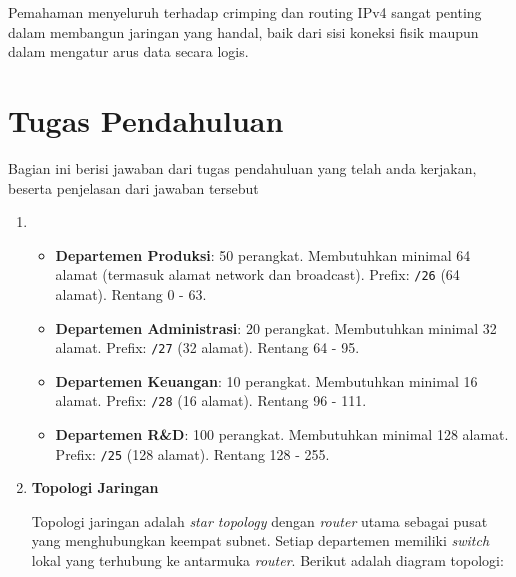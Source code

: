 Pemahaman menyeluruh terhadap crimping dan routing IPv4 sangat penting dalam membangun jaringan yang handal, baik dari sisi koneksi fisik maupun dalam mengatur arus data secara logis.

\section{Tugas Pendahuluan}
Bagian ini berisi jawaban dari tugas pendahuluan yang telah anda kerjakan, beserta penjelasan dari jawaban tersebut
\begin{enumerate}
	\item \begin{itemize}
    \item \textbf{Departemen Produksi}: 50 perangkat. Membutuhkan minimal 64 alamat (termasuk alamat network dan broadcast). Prefix: \texttt{/26} (64 alamat). Rentang 0 - 63.
    \item \textbf{Departemen Administrasi}: 20 perangkat. Membutuhkan minimal 32 alamat. Prefix: \texttt{/27} (32 alamat). Rentang 64 - 95.
    \item \textbf{Departemen Keuangan}: 10 perangkat. Membutuhkan minimal 16 alamat. Prefix: \texttt{/28} (16 alamat). Rentang 96 - 111.
    \item \textbf{Departemen R\&D}: 100 perangkat. Membutuhkan minimal 128 alamat. Prefix: \texttt{/25} (128 alamat). Rentang 128 - 255.
\end{itemize}
	\item \textbf{Topologi Jaringan}
    
    Topologi jaringan adalah \textit{star topology} dengan \textit{router} utama sebagai pusat yang menghubungkan keempat subnet. Setiap departemen memiliki \textit{switch} lokal yang terhubung ke antarmuka \textit{router}. Berikut adalah diagram topologi:
    
    \begin{center}
\end{center}
\end{enumerate}
